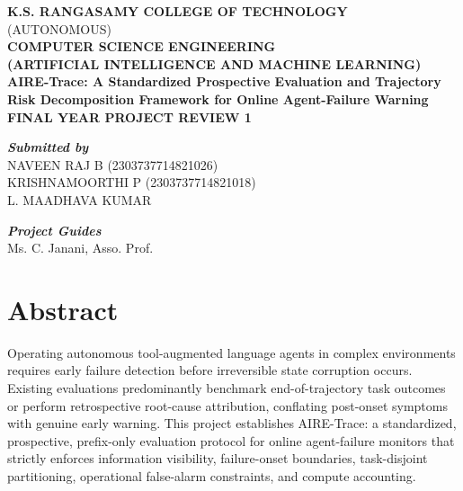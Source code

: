 \documentclass[12pt,a4paper]{article}
\begin{document}
\begin{titlepage}
    \begin{center}
        \vspace*{1.5cm}
        \textbf{\Large K.S. RANGASAMY COLLEGE OF TECHNOLOGY} \\[0.5em]
        {\large (AUTONOMOUS)} \\[3cm]
        
        \textbf{\large COMPUTER SCIENCE ENGINEERING} \\[0.5em]
        \textbf{\large (ARTIFICIAL INTELLIGENCE AND MACHINE LEARNING)} \\[2.5cm]
        
        \textbf{\Large AIRE-Trace: A Standardized Prospective Evaluation and Trajectory Risk Decomposition Framework for Online Agent-Failure Warning} \\[2cm]
        
        \textbf{\large FINAL YEAR PROJECT REVIEW 1} \\[2cm]
    \end{center}
    
    \vfill
    
    \begin{minipage}[t]{0.45\textwidth}
        \begin{flushleft}
            \textbf{\textit{\large Submitted by}} \\[1em]
            NAVEEN RAJ B (2303737714821026) \\
            KRISHNAMOORTHI P (2303737714821018) \\
            L. MAADHAVA KUMAR
        \end{flushleft}
    \end{minipage}
    \hfill
    \begin{minipage}[t]{0.45\textwidth}
        \begin{flushright}
            \textbf{\textit{\large Project Guides}} \\[1em]
            Ms. C. Janani, Asso. Prof.
        \end{flushright}
    \end{minipage}
    
    \vspace*{2cm}
\end{titlepage}


\newpage

\section{Abstract}
Operating autonomous tool-augmented language agents in complex environments requires early failure detection before irreversible state corruption occurs. Existing evaluations predominantly benchmark end-of-trajectory task outcomes or perform retrospective root-cause attribution, conflating post-onset symptoms with genuine early warning. This project establishes AIRE-Trace: a standardized, prospective, prefix-only evaluation protocol for online agent-failure monitors that strictly enforces information visibility, failure-onset boundaries, task-disjoint partitioning, operational false-alarm constraints, and compute accounting. 
\end{document}
